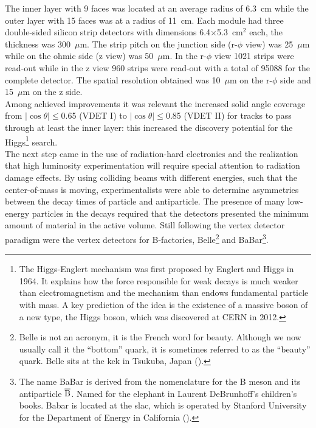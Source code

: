 The inner layer with 9 faces was located at an average radius of 6.3~cm while
the outer layer with 15 faces was at a radius of 11~cm.  Each module had three
double-sided silicon strip detectors with dimensions 6.4$\times$5.3~cm$^2$ each,
the thickness was 300~$\mu$m.  The strip pitch on the junction side (r-$\phi$
view) was 25~$\mu$m while on the ohmic side (z view) was 50~$\mu$m. In the
r-$\phi$ view 1021 strips were read-out while in the z view 960 strips were
read-out with a total of 95088 for the complete detector. The spatial resolution
obtained was 10~$\mu$m on the r-$\phi$ side and 15~$\mu$m
on the z side.\\
Among achieved improvements it was relevant the increased solid angle coverage
from $|\cos \theta|\leq$0.65 (VDET I) to $|\cos \theta|\leq$0.85 (VDET II) for
tracks to pass through at least the inner layer: this increased the discovery
potential for the Higgs\footnote{The Higgs-Englert mechanism was first proposed
  by Englert and Higgs in 1964. It explains how the force responsible for weak
  decays is much weaker than electromagnetism and the mechanism than endows
  fundamental particle with mass. A key prediction of the idea is the existence
  of a massive boson of a new type, the Higgs boson, which was discovered at
  CERN in 2012.}
search.\\

The next step came in the use of radiation-hard electronics and the realization
that high luminosity experimentation will require special attention to radiation
damage effects. By using colliding beams with different energies, such that the
center-of-mass is moving, experimentalists were able to determine asymmetries
between the decay times of particle and antiparticle. The presence of many
low-energy particles in the decays required that the detectors presented the
minimum amount of material in the active volume. Still following the vertex
detector paradigm were the vertex detectors for B-factories,
Belle\footnote{Belle is not an acronym, it is the French word for
  beauty. Although we now usually call it the ``bottom'' quark, it is sometimes
  referred to as the ``beauty'' quark. Belle sits at the \gls{kek} in Tsukuba,
  Japan ().} and BaBar\footnote{The name BaBar is derived from
  the nomenclature for the B meson and its antiparticle $\overline{\rm
    B}$.
  Named for the elephant in Laurent DeBrunhoff's children's books. Babar is
  located at the \gls{slac}, which is operated by Stanford University for the
  Department of Energy in California ().}.

